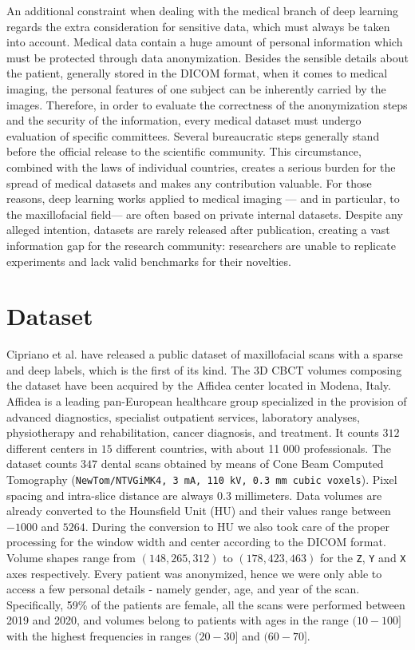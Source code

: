 An additional constraint when dealing with the medical branch of deep learning
regards the extra consideration for sensitive data, which must always be taken
into account. Medical data contain a huge amount of personal information which
must be protected through data anonymization. Besides the sensible details about
the patient, generally stored in the DICOM format, when it comes to medical
imaging, the personal features of one subject can be inherently carried by the
images. Therefore, in order to evaluate the correctness of the anonymization
steps and the security of the information, every medical dataset must undergo
evaluation of specific committees. Several bureaucratic steps generally stand
before the official release to the scientific community. This circumstance,
combined with the laws of individual countries, creates a serious burden for the
spread of medical datasets and makes any contribution valuable. For those
reasons, deep learning works applied to medical imaging — and in particular, to
the maxillofacial field— are often based on private internal datasets. Despite
any alleged intention, datasets are rarely released after publication, creating
a vast information gap for the research community: researchers are unable to
replicate experiments and lack valid benchmarks for their novelties.

\section{Dataset}
Cipriano et al. \cite{cipriano2022deep} have released a public dataset of
maxillofacial scans with a sparse and deep labels, which is the first of its
kind.
The 3D CBCT volumes composing the dataset have been acquired by the Affidea
center located in Modena, Italy. Affidea is a leading pan-European healthcare
group specialized in the provision of advanced diagnostics, specialist
outpatient services, laboratory analyses, physiotherapy and rehabilitation,
cancer diagnosis, and treatment. It counts $312$ different centers in $15$
different countries, with about 11 000 professionals. The dataset counts $347$
dental scans obtained by means of Cone Beam Computed Tomography
(\texttt{NewTom/NTVGiMK4, 3 mA, 110 kV, 0.3 mm cubic voxels}). Pixel spacing and
intra-slice distance are always $0.3$ millimeters. Data volumes are already
converted to the Hounsfield Unit (HU) and their values range between $-1000$ and
$5264$. During the conversion to HU we also took care of the proper processing
for the window width and center according to the DICOM format. Volume shapes
range from $(148, 265, 312)$ to $(178, 423, 463)$ for the \texttt{Z}, \texttt{Y}
and \texttt{X} axes respectively. Every patient was anonymized, hence we were
only able to access a few personal details - namely gender, age, and year of the
scan. Specifically, 59\% of the patients are female, all the scans were
performed between 2019 and 2020, and volumes belong to patients with ages in the
range $(10-100]$ with the highest frequencies in ranges $(20-30]$ and $(60-70]$.

